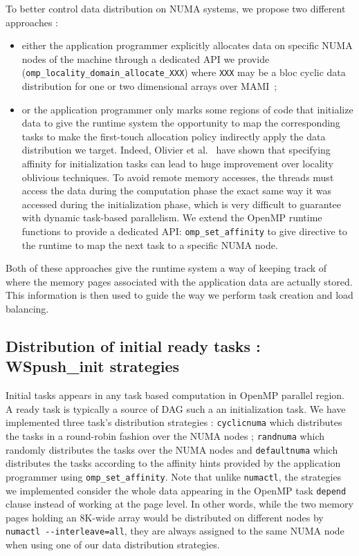 \documentclass{Styles/llncs}
\begin{document}
To better control data distribution on NUMA systems, we propose two different approaches :
\begin{itemize}
\item either the application programmer explicitly allocates data on specific NUMA nodes of the machine through a dedicated API we provide~\cite{Durand2013} (\verb!omp_locality_domain_allocate_XXX!) where \verb/XXX/ may be a bloc cyclic data distribution for one or two dimensional arrays over MAMI~\cite{BroFurGogWacNam10IJPP};
\item or the application programmer only marks some regions of code that initialize data to give the runtime system the opportunity to map the corresponding tasks to make the first-touch allocation policy indirectly apply the data distribution we target. Indeed, Olivier et al.~\cite{Olivier:2012:CMW:2388996.2389085}
have shown that specifying affinity for initialization tasks can lead to huge improvement over locality oblivious techniques.
To avoid remote memory accesses, the threads must access the data during the computation phase the exact same way it was accessed during the initialization phase, which is very difficult to guarantee with dynamic task-based parallelism. We extend the OpenMP runtime functions to provide a dedicated API: \verb!omp_set_affinity! to give directive to the runtime to map the next task to a specific NUMA node.
\end{itemize}
Both of these approaches give the runtime system a way of keeping track of where the memory pages associated with the application data are actually stored.
This information is then used to guide the way we perform task creation and load balancing.

\subsection{Distribution of initial ready tasks : WSpush\_init strategies}
Initial tasks appears in any task based computation in OpenMP parallel region. A ready task is typically a source of DAG such a an initialization task.
We have implemented three task's distribution strategies : \verb!cyclicnuma! which distributes the tasks in a round-robin fashion over the NUMA nodes ; \verb!randnuma! which randomly distributes the tasks over the NUMA nodes and \verb!defaultnuma! which distributes the tasks according to the affinity hints provided by the application programmer using \verb!omp_set_affinity!.
Note that unlike \verb!numactl!, the strategies we implemented consider the whole data appearing in the OpenMP task \verb!depend! clause instead of working at the page level. In other words, while the two memory pages holding an 8K-wide array would be distributed on different nodes by \verb!numactl --interleave=all!, they are always assigned to the same NUMA node when using one of our data distribution strategies.
\end{document}
